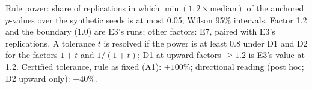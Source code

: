 Rule power: share of replications in which $\min(1, 2\times\mathrm{median})$ of the anchored $p$-values over the synthetic seeds is at most 0.05; Wilson 95\% intervals. Factor 1.2 and the boundary (1.0) are E3's runs; other factors: E7, paired with E3's replications. A tolerance $t$ is resolved if the power is at least 0.8 under D1 and D2 for the factors $1+t$ and $1/(1+t)$; D1 at upward factors $\ge 1.2$ is E3's value at 1.2. Certified tolerance, rule as fixed (A1): $\pm100\%$; directional reading (post hoc; D2 upward only): $\pm40\%$.
